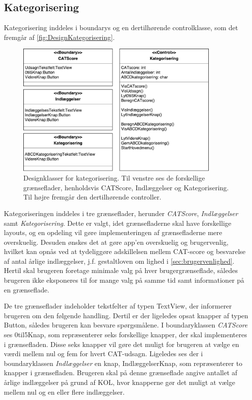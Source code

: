 \subsection*{Kategorisering}
Kategorisering inddeles i boundarys og en dertilhørende controlklasse, som det fremgår af \autoref{fig:DesignKategorisering}.

\begin{figure} [H]
\centering
\includegraphics[width=0.9\textwidth]{figures/MVC/MVCKategorisering}
\caption{Designklasser for kategorisering. Til venstre ses de forskellige grænseflader, henholdsvis CATScore, Indlæggelser og Kategorisering. Til højre fremgår den dertilhørende controller.}
\label{fig:DesignKategorisering}
\end{figure}

\noindent
Kategoriseringen inddeles i tre grænseflader, herunder \textit{CATScore}, \textit{Indlæggelser} samt \textit{Kategorisering}. Dette er valgt, idet grænsefladerne skal have forskellige layouts, og en opdeling vil gøre implementeringen af grænsefladerne mere overskuelig. Desuden ønskes det at gøre app’en overskuelig og
brugervenlig, hvilket kan opnås ved at tydeliggøre adskillelsen mellem CAT-score og besvarelse af antal årlige indlæggelser, j.f. gestaltloven om lighed i \autoref{sec:brugervenlighed}. Hertil skal brugeren foretage minimale valg på hver brugergrænseflade, således
brugeren ikke eksponeres til for mange valg på samme tid samt informationer på en grænseflade.

De tre grænseflader indeholder tekstfelter af typen TextView, der informerer brugeren om den følgende handling. Dertil er der ligeledes opsat knapper af typen Button, således brugeren kan besvare spørgsmålene. I boundaryklassen \textit{CATScore} ses 0til5Knap, som repræsenterer seks forskellige knapper, der skal implementeres i grænsefladen. Disse seks knapper vil gøre det muligt for brugeren at vælge en værdi mellem nul og fem for hvert CAT-udsagn. Ligeledes ses der i boundaryklassen \textit{Indlæggelser} en knap, IndlæggelserKnap, som repræsenterer to knapper i grænsefladen. Brugeren skal på denne grænseflade angive antallet af årlige indlæggelser på grund af KOL, hvor knapperne gør det muligt at vælge mellem nul og en eller flere indlæggelser.

